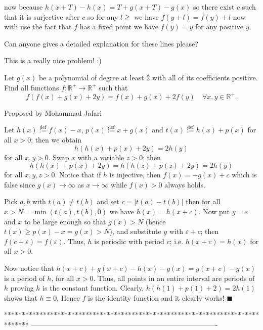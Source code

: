 \begin{solution}
	\begin{tcolorbox}
now because $h(x+T)-h(x)=T+g(x+T)-g(x)$ so there exist $c$ such that it is surjective after $c$ so for any $l\geqq$ we have $f(y+l)=f(y)+l$ now with use the fact that $f$ has a fixed point we have $f(y)=y$ for any positive $y$.\end{tcolorbox}

Can anyone gives a detailed explanation for these lines please?


\end{solution}



\begin{solution}
	This is a really nice problem! :)

\begin{tcolorbox}Let $g(x)$ be a polynomial of degree at least $2$ with all of its coefficients positive. Find all functions $f:\mathbb R^+ \longrightarrow \mathbb R^+$ such that
\[f(f(x)+g(x)+2y)=f(x)+g(x)+2f(y) \quad \forall x,y\in \mathbb R^+.\]

\begin{italicized}Proposed by Mohammad Jafari\end{italicized}\end{tcolorbox}

Let $h(x) \overset{\text{def}}{:=} f(x)-x$, $p(x) \overset{\text{def}}{:=} x+g(x)$ and $t(x) \overset{\text{def}}{:=} h(x)+p(x)$ for all $x>0$; then we obtain $$h(h(x)+p(x)+2y)=2h(y)$$ for all $x,y>0$. Swap $x$ with a variable $z>0$; then $$h(h(x)+p(x)+2y)=h(h(z)+p(z)+2y)=2h(y)$$ for all $x,y,z>0$. Notice that if $h$ is injective, then $f(x)=-g(x)+c$ which is false since $g(x) \rightarrow \infty$ as $x \rightarrow \infty$ while $f(x)>0$ always holds. 

Pick $a,b$ with $t(a) \ne t(b)$ and set $c=|t(a)-t(b)|$ then for all $x>N=\min(t(a), t(b), 0)$ we have $h(x)=h(x+c)$. Now put $y=\varepsilon$ and $x$ to be large enough so that $g(x)>N$ (hence $t(x) \ge p(x)-x=g(x)>N$), and substitute $y$ with $\varepsilon+c$; then $f(c+\varepsilon)=f(\varepsilon)$. Thus, $h$ is periodic with period $c$; i.e. $h(x+c)=h(x)$ for all $x>0$.

Now notice that $h(x+c)+g(x+c)-h(x)-g(x)=g(x+c)-g(x)$ is a period of $h$, for all $x>0$. Thus, all points in an entire interval are periods of $h$ proving $h$ is the constant function. Clearly, $h(h(1)+p(1)+2)=2h(1)$ shows that $h \equiv 0$. Hence $f$ is the identity function and it clearly works! $\blacksquare$
\end{solution}
*******************************************************************************
-------------------------------------------------------------------------------

